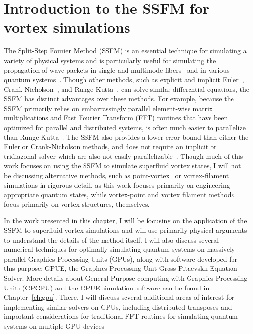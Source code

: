 \chapter{Introduction to the SSFM for vortex simulations}
\label{ch:splitop}
The Split-Step Fourier Method (SSFM) is an essential technique for simulating a variety of physical systems and is particularly useful for simulating the propagation of wave packets in single and multimode fibers~\cite{agrawal2000, sinkin2003, meirelles2005, min2003} and in various quantum systems~\cite{bayindir2015, weideman1986, wang2005}.
Though other methods, such as explicit and implicit Euler~\cite{butcher2016}, Crank-Nicholson~\cite{crank1947}, and Runge-Kutta~\cite{butcher2016}, can solve similar differential equations, the SSFM has distinct advantages over these methods.
For example, because the SSFM primarily relies on embarrassingly parallel element-wise matrix multiplications and Fast Fourier Transform (FFT) routines that have been optimized for parallel and distributed systems, is often much easier to parallelize than Runge-Kutta~\cite{brehler2017}.
The SSFM also provides a lower error bound than either the Euler or Crank-Nicholson methods, and does not require an implicit or tridiagonal solver \cite{conte2017, thomas1949} which are also not easily parallelizable~\cite{goddeke2010, wang1981, sweet1977}.
Though much of this work focuses on using the SSFM to simulate superfluid vortex states, I will not be discussing alternative methods, such as point-vortex~\cite{benzi1992} or vortex-filament~\cite{schwarz1988} simulations in rigorous detail, as this work focuses primarily on engineering appropriate quantum states, while vortex-point and vortex filament methods focus primarily on vortex structures, themselves.

In the work presented in this chapter, I will be focusing on the application of the SSFM to superfluid vortex simulations and will use primarily physical arguments to understand the details of the method itself.
I will also discuss several numerical techniques for optimally simulating quantum systems on massively parallel Graphics Processing Units (GPUs), along with software developed for this purpose: GPUE, the Graphics Processing Unit Gross-Pitaevskii Equation Solver.
More details about General Purpose computing with Graphics Processing Units (GPGPU) and the GPUE simulation software can be found in Chapter~\ref{ch:gpu}.
There, I will discuss several additional areas of interest for implementing similar solvers on GPUs, including distributed transposes and important considerations for traditional FFT routines for simulating quantum systems on multiple GPU devices.

